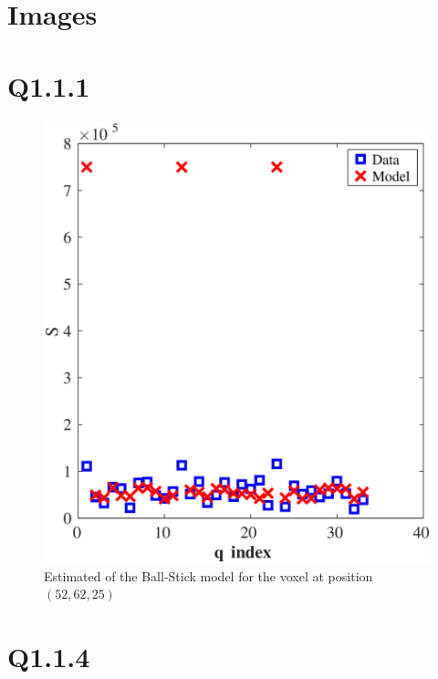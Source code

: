 \documentclass[11pt,a4paper,oneside]{report}
\begin{document}
\section*{Images}

\section*{Q1.1.1}

\begin{figure}[H]
\centering
\includegraphics[scale=0.5]{figures/q1/q111.eps}
\caption{Estimated of the Ball-Stick model for the voxel at position $(52,62,25)$}
\label{q111}
\end{figure}

\section*{Q1.1.4}
\end{document}
